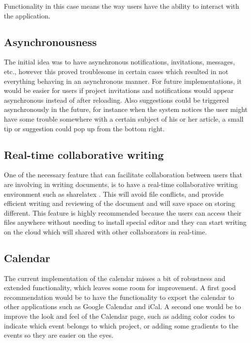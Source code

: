 Functionality in this case means the way users have the ability to interact with the application.

\subsection{Asynchronousness}

The initial idea was to have asynchronous notifications, invitations, messages, etc., however this proved troublesome in certain
cases which resulted in not everything behaving in an asynchronous manner. For future implementations, it would be easier for users
if project invitations and notifications would appear asynchronous instead of after reloading. Also suggestions could be
triggered asynchronously in the future, for instance when the system notices the user might have some trouble somewhere with
a certain subject of his or her article, a small tip or suggestion could pop up from the bottom right.

\subsection{Real-time collaborative writing } %
One of the necessary feature that can facilitate collaboration between users that are involving in writing documents, is to have a real-time collaborative writing environment such as sharelatex \cite{sharelatex}. This will avoid file conflicts, and provide efficient writing and reviewing of the document and will save space on storing different. This feature is highly recommended because the users can access their files anywhere without needing to install special editor and they can start writing on the cloud which will shared with other collaborators in real-time. 


\subsection{Calendar}

The current implementation of the calendar misses a bit of robustness and extended functionality, which leaves some room for
improvement. A first good recommendation would be to have the functionality to export the calendar to other applications such as
Google Calendar and iCal. A second one would be to improve the look and feel of the Calendar page, such as adding color codes to
indicate which event belongs to which project, or adding some gradients to the events so they are easier on the eyes.

